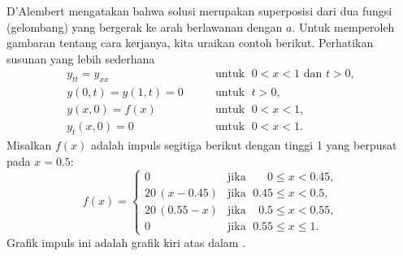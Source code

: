 \begin{example} \label{dalemb:implusexample}
D'Alembert mengatakan bahwa solusi merupakan superposisi dari
dua fungsi (gelombang) yang bergerak ke arah berlawanan dengan  $a$.
Untuk memperoleh gambaran tentang
cara kerjanya, kita uraikan contoh berikut.
Perhatikan susunan yang lebih sederhana
\begin{equation*}
\begin{array}{ll}
y_{tt} = y_{xx} & \qquad \text{untuk } \; 0 < x < 1 \text{ dan } t > 0, \\
y(0,t) = y(1,t) = 0 & \qquad \text{untuk } \; t > 0, \\
y(x,0) = f(x)  & \qquad \text{untuk } \; 0 < x < 1, \\
y_t(x,0) = 0   & \qquad \text{untuk } \; 0 < x < 1 .
\end{array}
\end{equation*}
Misalkan $f(x)$ adalah impuls segitiga berikut dengan tinggi 1 yang berpusat pada $x=0.5$:
\begin{equation*}
f(x) =
\begin{cases}
0 & \text{jika } \; \phantom{0.5}0 \leq x < 0.45, \\
20\,(x-0.45) & \text{jika } \; 0.45 \leq x < 0.5, \\
20\,(0.55-x) & \text{jika } \; \phantom{5}0.5 \leq x < 0.55, \\
0 & \text{jika } \; 0.55 \leq x \leq 1 .
\end{cases}
\end{equation*}
Grafik impuls ini adalah grafik kiri atas dalam
.


\end{example}
